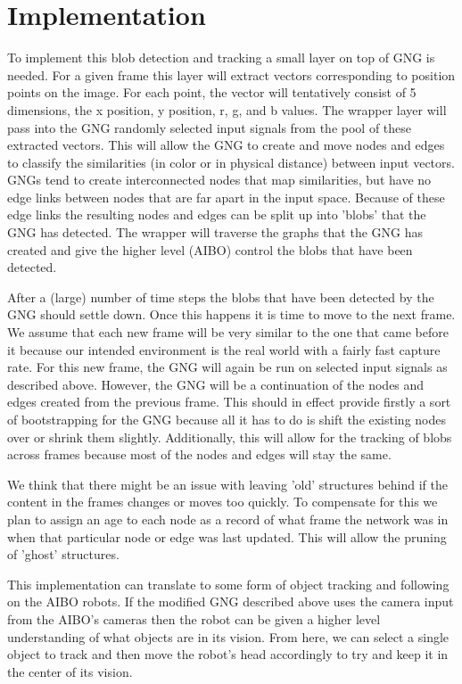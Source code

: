 \documentclass{article}
\begin{document}
\section{Implementation}
To implement this blob detection and tracking a small layer on top of GNG is needed. For a given frame this layer will extract vectors corresponding to position points on the image. For each point, the vector will tentatively consist of 5 dimensions, the x position, y position, r, g, and b values. The wrapper layer will pass into the GNG randomly selected input signals from the pool of these extracted vectors. This will allow the GNG to create and move nodes and edges to classify the similarities (in color or in physical distance) between input vectors. GNGs tend to create interconnected nodes that map similarities, but have no edge links between nodes that are far apart in the input space. Because of these edge links the resulting nodes and edges can be split up into 'blobs' that the GNG has detected. The wrapper will traverse the graphs that the GNG has created and give the higher level (AIBO) control the blobs that have been detected.

After a (large) number of time steps the blobs that have been detected by the GNG should settle down. Once this happens it is time to move to the next frame. We assume that each new frame will be very similar to the one that came before it because our intended environment is the real world with a fairly fast capture rate. For this new frame, the GNG will again be run on selected input signals as described above. However, the GNG will be a continuation of the nodes and edges created from the previous frame. This should in effect provide firstly a sort of bootstrapping for the GNG because all it has to do is shift the existing nodes over or shrink them slightly. Additionally, this will allow for the tracking of blobs across frames because most of the nodes and edges will stay the same. 

We think that there might be an issue with leaving 'old' structures behind if the content in the frames changes or moves too quickly. To compensate for this we plan to assign an age to each node as a record of what frame the network was in when that particular node or edge was last updated. This will allow the pruning of 'ghost' structures.

This implementation can translate to some form of object tracking and following on the AIBO robots. If the modified GNG described above uses the camera input from the AIBO's cameras then the robot can be given a higher level understanding of what objects are in its vision. From here, we can select a single object to track and then move the robot's head accordingly to try and keep it in the center of its vision.
\end{document}
